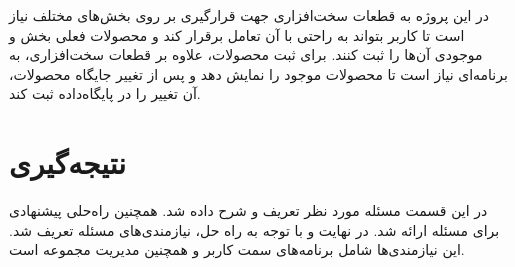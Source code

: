 در این پروژه به قطعات سخت‌افزاری جهت قرارگیری بر روی بخش‌های مختلف نیاز است تا کاربر بتواند به راحتی با آن تعامل برقرار کند و محصولات فعلی بخش  و موجودی آن‌ها را ثبت کنند. برای ثبت محصولات، علاوه بر قطعات سخت‌افزاری، به برنامه‌ای نیاز است تا محصولات موجود را نمایش دهد و پس از تغییر جایگاه محصولات، آن تغییر را در پایگاه‌داده ثبت کند.

\section{نتیجه‌گیری}
در این قسمت مسئله مورد نظر تعریف و شرح داده شد. همچنین راه‌حلی پیشنهادی برای مسئله ارائه شد. در نهایت و با توجه به راه حل، نیازمندی‌های مسئله تعریف شد. این نیازمندی‌ها شامل برنامه‌های سمت کاربر و همچنین مدیریت مجموعه است.
